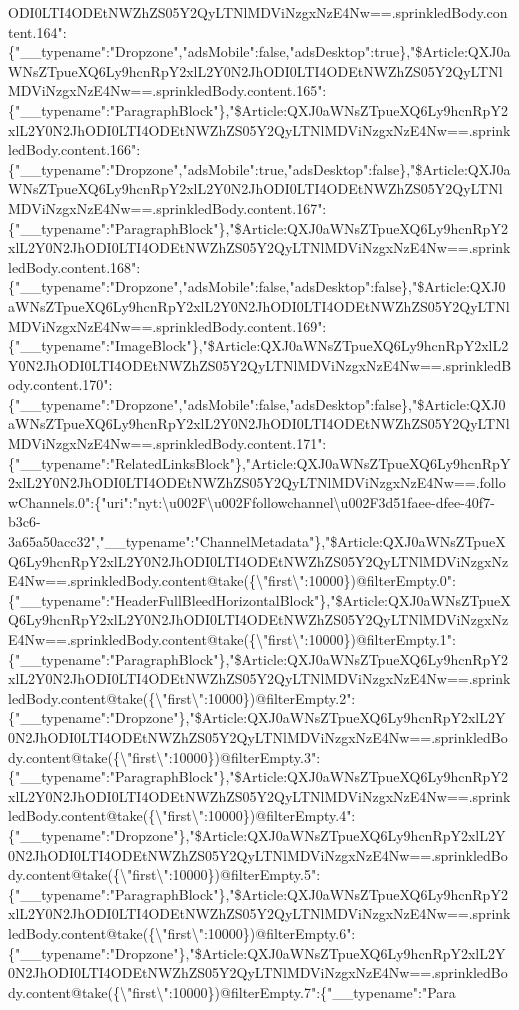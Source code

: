ODI0LTI4ODEtNWZhZS05Y2QyLTNlMDViNzgxNzE4Nw==.sprinkledBody.content.164":\{"\_\_typename":"Dropzone","adsMobile":false,"adsDesktop":true\},"\$Article:QXJ0aWNsZTpueXQ6Ly9hcnRpY2xlL2Y0N2JhODI0LTI4ODEtNWZhZS05Y2QyLTNlMDViNzgxNzE4Nw==.sprinkledBody.content.165":\{"\_\_typename":"ParagraphBlock"\},"\$Article:QXJ0aWNsZTpueXQ6Ly9hcnRpY2xlL2Y0N2JhODI0LTI4ODEtNWZhZS05Y2QyLTNlMDViNzgxNzE4Nw==.sprinkledBody.content.166":\{"\_\_typename":"Dropzone","adsMobile":true,"adsDesktop":false\},"\$Article:QXJ0aWNsZTpueXQ6Ly9hcnRpY2xlL2Y0N2JhODI0LTI4ODEtNWZhZS05Y2QyLTNlMDViNzgxNzE4Nw==.sprinkledBody.content.167":\{"\_\_typename":"ParagraphBlock"\},"\$Article:QXJ0aWNsZTpueXQ6Ly9hcnRpY2xlL2Y0N2JhODI0LTI4ODEtNWZhZS05Y2QyLTNlMDViNzgxNzE4Nw==.sprinkledBody.content.168":\{"\_\_typename":"Dropzone","adsMobile":false,"adsDesktop":false\},"\$Article:QXJ0aWNsZTpueXQ6Ly9hcnRpY2xlL2Y0N2JhODI0LTI4ODEtNWZhZS05Y2QyLTNlMDViNzgxNzE4Nw==.sprinkledBody.content.169":\{"\_\_typename":"ImageBlock"\},"\$Article:QXJ0aWNsZTpueXQ6Ly9hcnRpY2xlL2Y0N2JhODI0LTI4ODEtNWZhZS05Y2QyLTNlMDViNzgxNzE4Nw==.sprinkledBody.content.170":\{"\_\_typename":"Dropzone","adsMobile":false,"adsDesktop":false\},"\$Article:QXJ0aWNsZTpueXQ6Ly9hcnRpY2xlL2Y0N2JhODI0LTI4ODEtNWZhZS05Y2QyLTNlMDViNzgxNzE4Nw==.sprinkledBody.content.171":\{"\_\_typename":"RelatedLinksBlock"\},"Article:QXJ0aWNsZTpueXQ6Ly9hcnRpY2xlL2Y0N2JhODI0LTI4ODEtNWZhZS05Y2QyLTNlMDViNzgxNzE4Nw==.followChannels.0":\{"uri":"nyt:\textbackslash{}u002F\textbackslash{}u002Ffollowchannel\textbackslash{}u002F3d51faee-dfee-40f7-b3c6-3a65a50acc32","\_\_typename":"ChannelMetadata"\},"\$Article:QXJ0aWNsZTpueXQ6Ly9hcnRpY2xlL2Y0N2JhODI0LTI4ODEtNWZhZS05Y2QyLTNlMDViNzgxNzE4Nw==.sprinkledBody.content@take(\{\textbackslash{}"first\textbackslash{}":10000\})@filterEmpty.0":\{"\_\_typename":"HeaderFullBleedHorizontalBlock"\},"\$Article:QXJ0aWNsZTpueXQ6Ly9hcnRpY2xlL2Y0N2JhODI0LTI4ODEtNWZhZS05Y2QyLTNlMDViNzgxNzE4Nw==.sprinkledBody.content@take(\{\textbackslash{}"first\textbackslash{}":10000\})@filterEmpty.1":\{"\_\_typename":"ParagraphBlock"\},"\$Article:QXJ0aWNsZTpueXQ6Ly9hcnRpY2xlL2Y0N2JhODI0LTI4ODEtNWZhZS05Y2QyLTNlMDViNzgxNzE4Nw==.sprinkledBody.content@take(\{\textbackslash{}"first\textbackslash{}":10000\})@filterEmpty.2":\{"\_\_typename":"Dropzone"\},"\$Article:QXJ0aWNsZTpueXQ6Ly9hcnRpY2xlL2Y0N2JhODI0LTI4ODEtNWZhZS05Y2QyLTNlMDViNzgxNzE4Nw==.sprinkledBody.content@take(\{\textbackslash{}"first\textbackslash{}":10000\})@filterEmpty.3":\{"\_\_typename":"ParagraphBlock"\},"\$Article:QXJ0aWNsZTpueXQ6Ly9hcnRpY2xlL2Y0N2JhODI0LTI4ODEtNWZhZS05Y2QyLTNlMDViNzgxNzE4Nw==.sprinkledBody.content@take(\{\textbackslash{}"first\textbackslash{}":10000\})@filterEmpty.4":\{"\_\_typename":"Dropzone"\},"\$Article:QXJ0aWNsZTpueXQ6Ly9hcnRpY2xlL2Y0N2JhODI0LTI4ODEtNWZhZS05Y2QyLTNlMDViNzgxNzE4Nw==.sprinkledBody.content@take(\{\textbackslash{}"first\textbackslash{}":10000\})@filterEmpty.5":\{"\_\_typename":"ParagraphBlock"\},"\$Article:QXJ0aWNsZTpueXQ6Ly9hcnRpY2xlL2Y0N2JhODI0LTI4ODEtNWZhZS05Y2QyLTNlMDViNzgxNzE4Nw==.sprinkledBody.content@take(\{\textbackslash{}"first\textbackslash{}":10000\})@filterEmpty.6":\{"\_\_typename":"Dropzone"\},"\$Article:QXJ0aWNsZTpueXQ6Ly9hcnRpY2xlL2Y0N2JhODI0LTI4ODEtNWZhZS05Y2QyLTNlMDViNzgxNzE4Nw==.sprinkledBody.content@take(\{\textbackslash{}"first\textbackslash{}":10000\})@filterEmpty.7":\{"\_\_typename":"Para